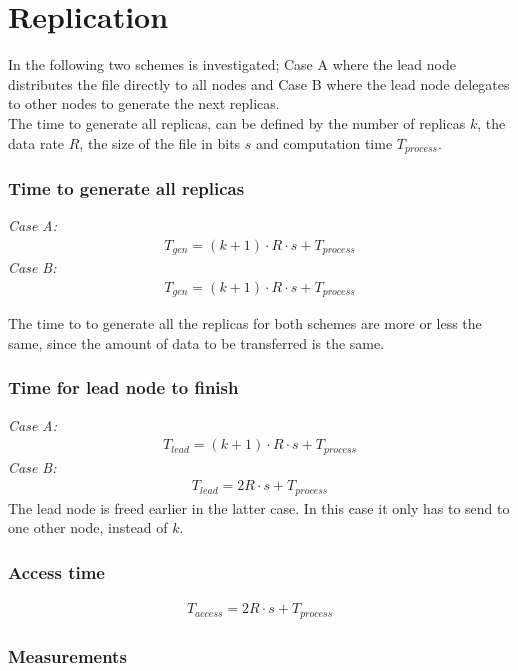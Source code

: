 \section{Replication}
In the following two schemes is investigated; Case A where the lead node distributes the file directly to all nodes and Case B where the lead node delegates to other nodes to generate the next replicas. \\
The time to generate all replicas, can be defined by the number of replicas $k$, the data rate $R$, the size of the file in bits $s$ and computation time $T_{process}$. 

\subsubsection*{Time to generate all replicas}
\textit{Case A:} 
\begin{align}
    T_{gen} = (k+1)\cdot R\cdot s + T_{process}
\end{align}
\textit{Case B:} 
\begin{align}
    T_{gen} = (k+1)\cdot R\cdot s + T_{process}
\end{align}

The time to to generate all the replicas for both schemes are more or less the same, since the amount of data to be transferred is the same. 

\subsubsection*{Time for lead node to finish}
\textit{Case A:}
\begin{align}
    T_{lead} = (k+1)\cdot R\cdot s + T_{process}
\end{align}
\textit{Case B:}
\begin{align}
    T_{lead} = 2R \cdot s + T_{process}
\end{align}
The lead node is freed earlier in the latter case. In this case it only has to send to one other node, instead of $k$.

\subsubsection*{Access time}
\begin{align}
    T_{access} = 2R \cdot s + T_{process}
\end{align}

\subsubsection*{Measurements}

